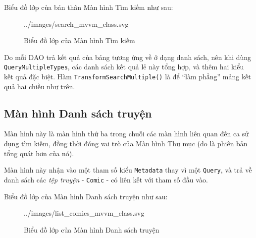 \documentclass[../../../../thesis]{subfiles}
\begin{document}
Biểu đồ lớp của bản thân Màn hình Tìm kiếm như sau:

\begin{figure}[H]
    \centering
    
        {../images/search_mvvm_class.svg}
    \caption{Biểu đồ lớp của Màn hình Tìm kiếm}
    \label{fig:search_mvvm_class}
\end{figure}

Do mỗi DAO trả kết quả của bảng tương ứng về ở dạng danh sách, nên khi dùng
\texttt{QueryMultipleTypes}, các danh sách kết quả lẻ này tổng hợp, và thêm hai
kiểu kết quả đặc biệt. Hàm \texttt{TransformSearchMultiple()} là để ``làm
phẳng'' mảng kết quả hai chiều như trên.



\subsection{Màn hình Danh sách truyện}\label{sec:list-comic-design}

Màn hình này là màn hình thứ ba trong chuỗi các màn hình liên quan đến ca sử
dụng tìm kiếm, đồng thời đóng vai trò của Màn hình Thư mục (do là phiên bản tổng
quát hơn của nó).

Màn hình này nhận vào một tham số kiểu \texttt{Metadata} thay vì một
\texttt{Query}, và trả về danh sách các \emph{tệp truyện} - \texttt{Comic} - có
liên kết với tham số đầu vào.

Biểu đồ lớp của Màn hình Danh sách truyện như sau:

\begin{figure}[H]
    \centering
    
        {../images/list_comics_mvvm_class.svg}
    \caption{Biểu đồ lớp của Màn hình Danh sách truyện}
    \label{fig:list_comics_mvvm_class}
\end{figure}
\end{document}
